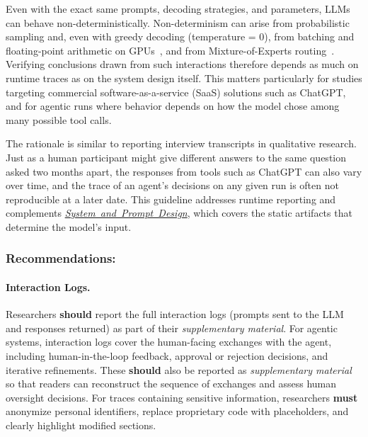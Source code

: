 \documentclass[smallextended]{svjour3}
\newcommand{\must}{\textbf{must}\xspace}
\newcommand{\should}{\textbf{should}\xspace}
\newcommand{\supplementarymaterial}{\emph{supplementary material}\xspace}
\newcommand{\supplementarymaterial}{\emph{supplementary material}\xspace}
\newcommand{\design}{\hyperref[sec:report-system-and-prompt-design]{\mbox{\emph{System and Prompt Design}}}\xspace}
\newcommand{\design}{\href{/guidelines/design/}{\emph{System and Prompt Design}}\xspace}
\newcommand{\guidelinesubsubsection}[1]{\subsubsection{\bfseries #1:}}
\newcommand{\guidelineparagraph}[1]{\paragraph{#1.}}
\newcommand{\guidelinesubsubsection}[1]{\subsubsection{#1}}
\newcommand{\guidelineparagraph}[1]{\paragraph{#1}}
\begin{document}
Even with the exact same prompts, decoding strategies, and parameters, LLMs can behave non-deterministically.
Non-determinism can arise from probabilistic sampling and, even with greedy decoding (temperature = 0), from batching and floating-point arithmetic on GPUs~\cite{YuanNondeterminismLLMInference}, and from Mixture-of-Experts routing~\cite{Chann2023}.
Verifying conclusions drawn from such interactions therefore depends as much on runtime traces as on the system design itself.
This matters particularly for studies targeting commercial software-as-a-service (SaaS) solutions such as ChatGPT, and for agentic runs where behavior depends on how the model chose among many possible tool calls.

The rationale is similar to reporting interview transcripts in qualitative research.
Just as a human participant might give different answers to the same question asked two months apart, the responses from tools such as ChatGPT can also vary over time, and the trace of an agent's decisions on any given run is often not reproducible at a later date.
This guideline addresses runtime reporting and complements \design, which covers the static artifacts that determine the model's input.

\guidelinesubsubsection{Recommendations}

\guidelineparagraph{Interaction Logs}
Researchers \should report the full interaction logs (prompts sent to the LLM and responses returned) as part of their \supplementarymaterial.
For agentic systems, interaction logs cover the human-facing exchanges with the agent, including human-in-the-loop feedback, approval or rejection decisions, and iterative refinements.
These \should also be reported as \supplementarymaterial so that readers can reconstruct the sequence of exchanges and assess human oversight decisions.
For traces containing sensitive information, researchers \must anonymize personal identifiers, replace proprietary code with placeholders, and clearly highlight modified sections.
\end{document}
